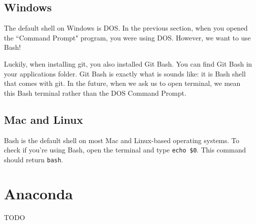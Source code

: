 \documentclass[12pt]{article}
\numberwithin{equation}{section}
\begin{document}
	\subsection{Windows}
	The default shell on Windows is DOS.  In the previous section, when you opened the ``Command Prompt" program, you were using DOS. However, we want to use Bash!
	
	Luckily, when installing git, you also installed Git Bash. You can find Git Bash in your applications folder. Git Bash is exactly what is sounds like: it is Bash shell that comes with git. In the future, when we ask us to open terminal, we mean this Bash terminal rather than the DOS Command Prompt.
	
	\subsection{Mac and Linux}
	Bash is the default shell on most Mac and Linux-based operating systems. To check if you're using Bash, open the terminal and type \verb|echo $0|. This command should return \verb|bash|. 
	
	\section{Anaconda}
	
	TODO
\end{document}
